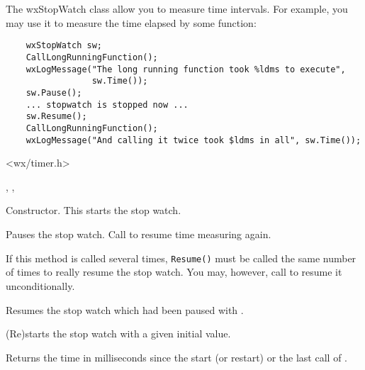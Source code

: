 \section{}\label{wxstopwatch}

The wxStopWatch class allow you to measure time intervals. For example, you may
use it to measure the time elapsed by some function:

\begin{verbatim}
    wxStopWatch sw;
    CallLongRunningFunction();
    wxLogMessage("The long running function took %ldms to execute",
                 sw.Time());
    sw.Pause();
    ... stopwatch is stopped now ...
    sw.Resume();
    CallLongRunningFunction();
    wxLogMessage("And calling it twice took $ldms in all", sw.Time());
\end{verbatim}


<wx/timer.h>


, , 




Constructor. This starts the stop watch.

\label{wxstopwatchpause}


Pauses the stop watch. Call  to resume 
time measuring again.

If this method is called several times, {\tt Resume()} must be called the same
number of times to really resume the stop watch. You may, however, call 
 to resume it unconditionally.

\label{wxstopwatchresume}


Resumes the stop watch which had been paused with 
.

\label{wxstopwatchstart}


(Re)starts the stop watch with a given initial value.


\label{wxstopwatchtime}

Returns the time in milliseconds since the start (or restart) or the last call of 
.

